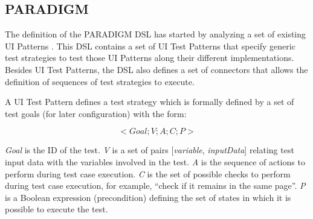 \documentclass[conference]{IEEEtran}
\begin{document}
\subsection{PARADIGM}
The definition of the PARADIGM DSL has started by analyzing a set of existing UI Patterns \cite{van2001patterns}. This DSL contains a set of UI Test Patterns that specify generic test strategies to test those UI Patterns along their different implementations. Besides UI Test Patterns, the DSL also defines a set of connectors that allows the definition of sequences of test strategies to execute.

A UI Test Pattern defines a test strategy which is formally defined by a set of test goals (for later configuration) \cite{moreira2013pattern} with the form:

\begin{equation}< Goal; V; A; C; P >\end{equation}\label{eq:ui}

\textit{Goal} is the ID of the test. \textit{V} is a set of pairs { [\textit{variable}, \textit{inputData}] } relating test input data with the variables involved in the test. \textit{A} is the sequence of actions to perform during test case execution. \textit{C} is the set of possible checks to perform during test case execution, for example, “check if it remains in the same page”. \textit{P} is a Boolean expression (precondition) defining the set of states in which it is possible to execute the test.
\end{document}
